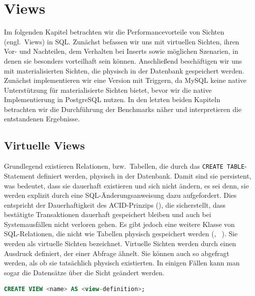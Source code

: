 
\chapter{Views}\label{ch:views}
Im folgenden Kapitel betrachten wir die Performancevorteile von Sichten (engl.\ Views) in SQL\@.
Zunächst befassen wir uns mit virtuellen Sichten, ihren Vor- und Nachteilen, dem Verhalten bei Inserts sowie möglichen Szenarien, in denen sie besonders vorteilhaft sein können.
Anschließend beschäftigen wir uns mit materialisierten Sichten, die physisch in der Datenbank gespeichert werden.
Zunächst implementieren wir eine Version mit Triggern, da MySQL keine native Unterstützung für materialisierte Sichten bietet, bevor wir die native Implementierung in PostgreSQL nutzen.
In den letzten beiden Kapiteln betrachten wir die Durchführung der Benchmarks näher und interpretieren die entstandenen Ergebnisse.

\section{Virtuelle Views}\label{sec:virtuelle-views}

Grundlegend existieren Relationen, bzw.\ Tabellen, die durch das \texttt{CREATE TABLE}-Statement definiert werden, physisch in der Datenbank.
Damit sind sie persistent, was bedeutet, dass sie dauerhaft existieren und sich nicht ändern, es sei denn, sie werden explizit durch eine SQL-Änderungsanweisung dazu aufgefordert.
Dies entspricht der Dauerhaftigkeit des ACID-Prinzips (\cite{acid_eigenschaften}), die sicherstellt, dass bestätigte Transaktionen dauerhaft gespeichert bleiben und auch bei Systemausfällen nicht verloren gehen.
Es gibt jedoch eine weitere Klasse von SQL-Relationen, die nicht wie Tabellen physisch gespeichert werden (\cite[341--349, 353--366]{garcia2008database}, ~\cite[pp. 276--281]{schwartz2012high}).
Sie werden als virtuelle Sichten bezeichnet.
Virtuelle Sichten werden durch einen Ausdruck definiert, der einer Abfrage ähnelt.
Sie können auch so abgefragt werden, als ob sie tatsächlich physisch existierten.
In einigen Fällen kann man sogar die Datensätze über die Sicht geändert werden.

\vspace{-5pt}
\begin{lstlisting}[language=SQL,caption=Allgemeine View-Deklaration,label={lst:create_view}]
CREATE VIEW <name> AS <view-definition>;
\end{lstlisting}
\vspace{-5pt}

